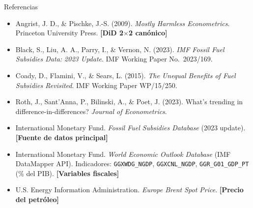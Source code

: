 \documentclass[aspectratio=169,10pt]{beamer}
\begin{document}
\begin{frame}{Referencias}
  \scriptsize
  \begin{itemize}\setlength{\itemsep}{1pt}
    \item Angrist, J. D., \& Pischke, J.-S. (2009). \emph{Mostly Harmless Econometrics}.
          Princeton University Press. \textbf{[DiD 2$\times$2 canónico]}
    \item Black, S., Liu, A. A., Parry, I., \& Vernon, N. (2023). \emph{IMF Fossil Fuel Subsidies
          Data: 2023 Update}. IMF Working Paper No.\ 2023/169.
    \item Coady, D., Flamini, V., \& Sears, L. (2015). \emph{The Unequal Benefits of Fuel Subsidies
          Revisited}. IMF Working Paper WP/15/250.
    \item Roth, J., Sant'Anna, P., Bilinski, A., \& Poet, J. (2023). What's trending in
          difference-in-differences? \emph{Journal of Econometrics}.
    \item International Monetary Fund. \emph{Fossil Fuel Subsidies Database} (2023 update).
          \textbf{[Fuente de datos principal]}
    \item International Monetary Fund. \emph{World Economic Outlook Database}
          (IMF DataMapper API). Indicadores: \texttt{GGXWDG\_NGDP}, \texttt{GGXCNL\_NGDP},
          \texttt{GGR\_G01\_GDP\_PT} (\% del PIB). \textbf{[Variables fiscales]}
    \item U.S. Energy Information Administration. \emph{Europe Brent Spot Price}.
          \textbf{[Precio del petróleo]}
  \end{itemize}

\end{frame}


\end{document}
